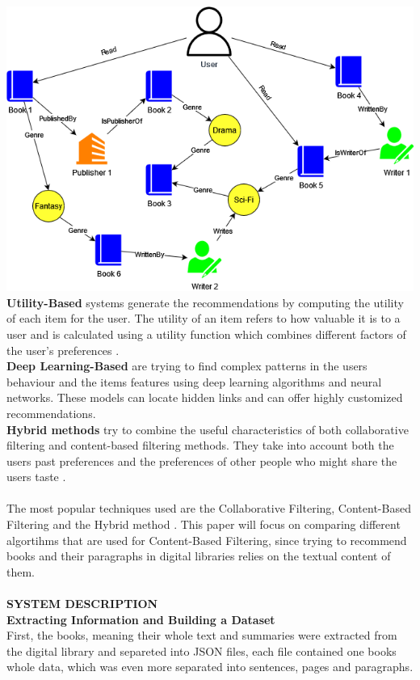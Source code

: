 \documentclass[10pt, oneside,english,hidelinks,a4paper]{article}
\begin{document}
\begin{multicols}{2}
\noindent
\includegraphics[width=\columnwidth]{img/knowledge_graph_example.png}
\textbf{Utility-Based} systems generate the recommendations by computing the utility of each item for the user. The utility of an item refers to how valuable it is to a user and is calculated using a utility function which combines different factors of the user's preferences \cite{Burke2002331}.\\
\textbf{Deep Learning-Based} are trying to find complex patterns in the users behaviour and the items features using deep learning algorithms and neural networks. These models can locate hidden links and can offer highly customized recommendations.\\
\textbf{Hybrid methods} try to combine the useful characteristics of both collaborative filtering and content-based filtering methods. They take into account both the users past preferences and the preferences of other people who might share the users taste \cite{melville:aaai02}. \\\\
%
The most popular techniques used are the Collaborative Filtering, Content-Based Filtering and the Hybrid method \cite{pub.1072601078}. This paper will focus on comparing different algortihms that are used for Content-Based Filtering, since trying to recommend books and their paragraphs in digital libraries relies on the textual content of them.\\\\
%
%
%
\textbf{SYSTEM DESCRIPTION}\\
\textbf{Extracting Information and Building a Dataset}\\
First, the books, meaning their whole text and summaries were extracted from the digital library and separeted into JSON files, each file contained one books whole data, which was even more separated into sentences, pages and paragraphs.\\

\end{multicols}
\end{document}
